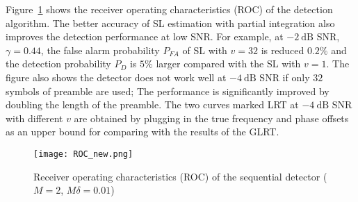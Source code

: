 Figure~\ref{fig:Receiver operating characteristics} shows the receiver
operating characteristics (ROC) of the detection algorithm. 
The better accuracy of SL estimation with partial integration also
improves the detection performance  at low SNR.
For example, at $\SI{-2}{\dB}$ SNR, $\gamma=0.44$, the false alarm probability $P_{FA}$ of SL with $v=32$ is reduced $0.2\%$ and 
the detection probability $P_{D}$ is $5\%$ larger compared with the SL with $v{=}1$. 
The figure also shows the detector does not work well at $\SI{-4}{\dB}$ SNR if only $32$ symbols of preamble are used;  
The performance is significantly improved by doubling the length of
the preamble. The two curves marked LRT at $\SI{-4}{\dB}$ SNR with different $v$
are obtained by plugging in the true frequency and phase offsets as an upper bound for comparing with 
the results of the GLRT.   

\begin{figure}[t]
  \centerline{\texttt{[image: ROC\_new.png]}}
  \caption{Receiver operating characteristics (ROC) of the sequential detector ($M=2$, $M\delta=0.01$)}
  \label{fig:Receiver operating characteristics}
\end{figure}

